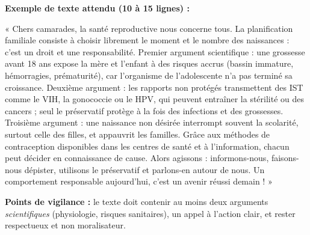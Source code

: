 \documentclass[11pt]{article}
\begin{document}
\begin{corrige}
\textbf{Exemple de texte attendu (10 à 15 lignes) :}

« Chers camarades, la santé reproductive nous concerne tous. La planification familiale consiste à choisir librement le moment et le nombre des naissances : c'est un droit et une responsabilité. Premier argument scientifique : une grossesse avant 18 ans expose la mère et l'enfant à des risques accrus (bassin immature, hémorragies, prématurité), car l'organisme de l'adolescente n'a pas terminé sa croissance. Deuxième argument : les rapports non protégés transmettent des IST comme le VIH, la gonococcie ou le HPV, qui peuvent entraîner la stérilité ou des cancers ; seul le préservatif protège à la fois des infections et des grossesses. Troisième argument : une naissance non désirée interrompt souvent la scolarité, surtout celle des filles, et appauvrit les familles. Grâce aux méthodes de contraception disponibles dans les centres de santé et à l'information, chacun peut décider en connaissance de cause. Alors agissons : informons-nous, faisons-nous dépister, utilisons le préservatif et parlons-en autour de nous. Un comportement responsable aujourd'hui, c'est un avenir réussi demain ! »

\textbf{Points de vigilance :} le texte doit contenir au moins deux arguments \emph{scientifiques} (physiologie, risques sanitaires), un appel à l'action clair, et rester respectueux et non moralisateur.
\end{corrige}
\end{document}
